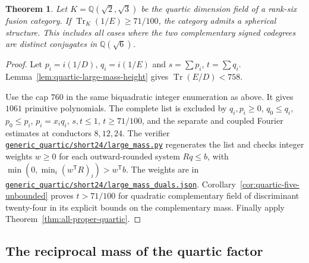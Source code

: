 \documentclass[11pt,reqno]{amsart}
\newcommand{\codefile}[1]{\href{https://github.com/sebastienpalcoux/grothendieck-ring-classification/blob/d5750105bb5758f3ad38d2e5464dfcc12c019816/supplements/rank6/sphericality/#1}{\nolinkurl{#1}}}
\newtheorem{theorem}{Theorem}[section]
\theoremstyle{remark}\newtheorem{remark}[theorem]{Remark}
\numberwithin{equation}{section}
\begin{document}
\begin{theorem}\label{thm:quartic-twenty-four-large-mass}
Let $K=\mathbb Q(\sqrt2,\sqrt3)$ be the quartic dimension field of a
rank-six fusion category. If $\operatorname{Tr}_K(1/E)\ge71/100$,
the category admits a spherical structure. This includes all cases
where the two complementary signed codegrees are distinct conjugates
in $\mathbb Q(\sqrt6)$.
\end{theorem}
\begin{proof}
Let $p_i=i(1/D)$, $q_i=i(1/E)$ and $s=\sum p_i$, $t=\sum q_i$.
Lemma~\ref{lem:quartic-large-mass-height} gives
$\operatorname{Tr}(E/D)<758$.

Use the cap $760$ in the same biquadratic integer enumeration as
above. It gives $1061$ primitive polynomials. The complete list is
excluded by $q_i,p_i\ge0$, $q_0\le q_i$, $p_0\le p_i$, $p_i=x_iq_i$,
$s,t\le1$, $t\ge71/100$, and the separate and coupled Fourier
estimates at conductors $8,12,24$. The verifier
\codefile{generic_quartic/short24/large_mass.py} regenerates the list and checks
integer weights $w\ge0$ for each outward-rounded system $Rq\le b$,
with $\min(0,\min_i(w^{\mathsf T}R)_i)>w^{\mathsf T}b$. The
weights are in \codefile{generic_quartic/short24/large_mass_duals.json}.
Corollary~\ref{cor:quartic-five-unbounded} proves $t>71/100$ for
quadratic complementary field of discriminant twenty-four in its
explicit bounds on the complementary mass. Finally apply
Theorem~\ref{thm:all-proper-quartic}.
\end{proof}

\subsection{The reciprocal mass of the quartic factor}
\end{document}
